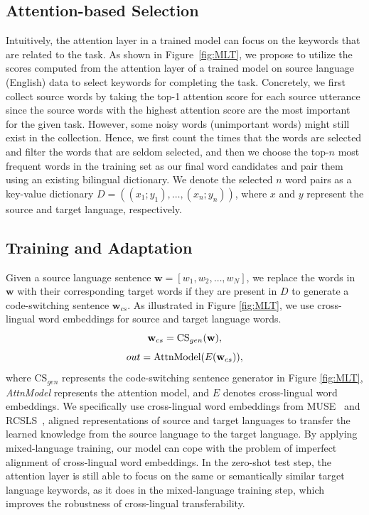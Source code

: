 \documentclass[letterpaper]{article} %
\begin{document}
\subsection{Attention-based Selection}
Intuitively, the attention layer in a trained model can focus on the keywords that are related to the task. As shown in Figure~\ref{fig:MLT}, we propose to utilize the scores computed from the attention layer of a trained model on source language (English) data to select keywords for completing the task. 
Concretely, we first collect source words by taking the top-1 attention score for each source utterance since the source words with the highest attention score are the most important for the given task. However, some noisy words (unimportant words) might still exist in the collection. Hence, we first count the times that the words are selected and filter the words that are seldom selected, and then we choose the top-$n$ most frequent words in the training set as our final word candidates and pair them using an existing bilingual dictionary. We denote the selected $n$ word pairs as a key-value dictionary $D =  ((x_1;y_1),\dots,(x_n;y_n))$, where $x$ and $y$ represent the source and target language, respectively.

\subsection{Training and Adaptation}

Given a source language sentence $\mathbf{w}=[w_1,w_2,\dots,w_N]$, we replace the words in $\mathbf{w}$ with their corresponding target words if they are present in $D$ to generate a code-switching sentence $\mathbf{w}_{cs}$.
As illustrated in Figure \ref{fig:MLT}, we use cross-lingual word embeddings for source and target language words. 
\begin{equation}
    \mathbf{w}_{cs} = \textnormal{CS}_{gen}(\mathbf{w}),
\end{equation}
\begin{equation}
    out = \textnormal{AttnModel}(E(\mathbf{w}_{cs})),
\end{equation}
where CS$_{gen}$ represents the code-switching sentence generator in Figure \ref{fig:MLT}, \textit{AttnModel} represents the attention model, and $E$ denotes cross-lingual word embeddings. We specifically use cross-lingual word embeddings from MUSE~\cite{conneau2017word} and RCSLS~\cite{joulin2018loss}, aligned representations of source and target languages to transfer the learned knowledge from the source language to the target language. By applying mixed-language training, our model can cope with the problem of imperfect alignment of cross-lingual word embeddings. In the zero-shot test step, the attention layer is still able to focus on the same or semantically similar target language keywords, as it does in the mixed-language training step, which improves the robustness of cross-lingual transferability.
\end{document}
